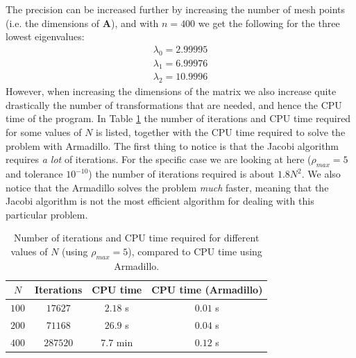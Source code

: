 \documentclass[12pt, a4paper]{article}
\begin{document}
The precision can be increased further by increasing the number of mesh points (i.e. the dimensions 
of $\mathbf{A}$), and with $n = 400$ we get the following for the three lowest eigenvalues: 
\begin{align*}
\lambda_0 = 2.99995 \\
\lambda_1 = 6.99976 \\
\lambda_2 = 10.9996 
\end{align*}
However, when increasing the dimensions of the matrix we also increase quite drastically the number of 
transformations that are needed, and hence the CPU time of the program. In Table \ref{tab:It_and_CPU} 
the number of iterations and CPU time required for some values of $N$ is listed, together with the 
CPU time required to solve the problem with Armadillo. The first thing to notice is that the Jacobi 
algorithm requires \textit{a lot} of iterations. For the specific case we are looking at here 
($\rho_{max} = 5$ and tolerance $10^{-10}$) the number of iterations required is about $1.8N^2$. 
We also notice that the Armadillo solves the problem \textit{much} faster, meaning that the Jacobi 
algorithm is not the most efficient algorithm for dealing with this particular problem.   

\begin{table}
\begin{center}
\caption{Number of iterations and CPU time required for different values of $N$ (using $\rho_{max} = 5$),
compared to CPU time using Armadillo.}
\label{tab:It_and_CPU}
\begin{tabular}{cccc} \hline \hline 
$N$ & Iterations & CPU time & CPU time (Armadillo) \\ \hline 
$100$ & $17627$  & $2.18$ s  & $0.01$ s \\
$200$ & $71168$  & $26.9$ s  & $0.04$ s \\
$400$ & $287520$ & $7.7$ min & $0.12$ s \\ \hline \hline
\end{tabular}
\end{center}
\end{table}
\end{document}
